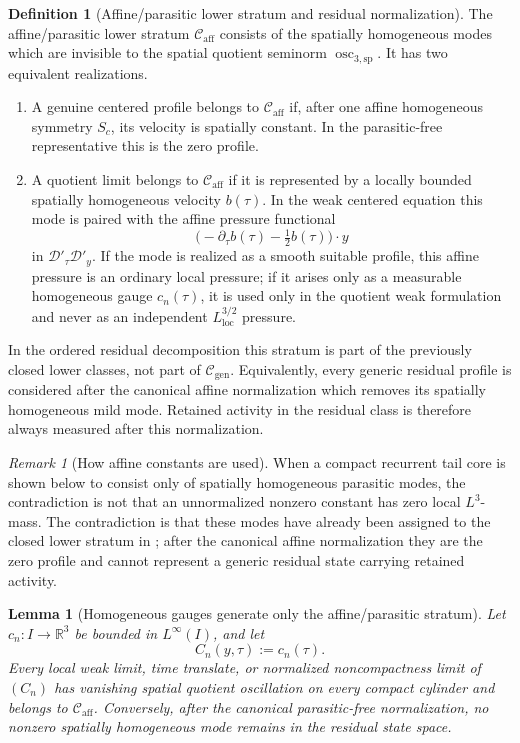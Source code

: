 \documentclass[11pt]{amsart}
\numberwithin{equation}{section}
\theoremstyle{plain}
\newtheorem{lemma}[theorem]{Lemma}
\theoremstyle{definition}
\newtheorem{definition}[theorem]{Definition}
\theoremstyle{remark}
\newtheorem{remark}[theorem]{Remark}
\newcommand{\loc}{\mathrm{loc}}
\newcommand{\Caff}{\mathcal C_{\mathrm{aff}}}
\newcommand{\Cgen}{\mathcal C_{\mathrm{gen}}}
\newcommand{\oscsp}{\operatorname{osc}_{3,\mathrm{sp}}}
\begin{document}
\begin{definition}[Affine/parasitic lower stratum and residual normalization]
\label{def:affine-constant-lower-stratum}
The affine/parasitic lower stratum \(\Caff\) consists of the spatially
homogeneous modes which are invisible to the spatial quotient seminorm
\(\oscsp\).  It has
two equivalent realizations.
\begin{enumerate}[label=\textup{(\roman*)}]
   \item A genuine centered profile belongs to \(\Caff\) if, after one affine
   homogeneous symmetry \(S_c\), its velocity is spatially constant.  In the
   parasitic-free representative this is the zero profile.
   \item A quotient limit belongs to \(\Caff\) if it is represented by a
   locally bounded spatially homogeneous velocity \(b(\tau)\).  In the weak
   centered equation this mode is paired with the affine pressure functional
   \[
      \bigl(-\partial_\tau b(\tau)-\tfrac12 b(\tau)\bigr)\cdot y
   \]
   in \(\mathcal D'_\tau\mathcal D'_y\).  If the mode is realized as a smooth
   suitable profile, this affine pressure is an ordinary local pressure; if it
   arises only as a measurable homogeneous gauge \(c_n(\tau)\), it is used only
   in the quotient weak formulation and never as an independent
   \(L^{3/2}_{\loc}\) pressure.
\end{enumerate}
In the ordered residual decomposition this stratum is part of the previously
closed lower classes, not part of \(\Cgen\).  Equivalently, every generic
residual profile is considered after the canonical affine normalization which
removes its spatially homogeneous mild mode.  Retained activity in the residual
class is therefore always measured after this normalization.
\end{definition}

\begin{remark}[How affine constants are used]
\label{rem:affine-constant-use}
When a compact recurrent tail core is shown below to consist only of spatially
homogeneous parasitic modes, the contradiction is not that an unnormalized
nonzero constant has zero local \(L^3\)-mass.  The contradiction is that these
modes have already been assigned to the closed lower stratum in
; after the canonical affine
normalization they are the zero profile and cannot represent a generic residual
state carrying retained activity.
\end{remark}

\begin{lemma}[Homogeneous gauges generate only the affine/parasitic stratum]
\label{lem:homogeneous-gauges-are-affine-stratum}
Let \(c_n:I\to\mathbb R^3\) be bounded in \(L^\infty(I)\), and let
\[
   C_n(y,\tau):=c_n(\tau).
\]
Every local weak limit, time translate, or normalized noncompactness limit of
\((C_n)\) has vanishing spatial quotient oscillation on every compact cylinder
and belongs to \(\Caff\).  Conversely, after the canonical
parasitic-free normalization, no nonzero spatially homogeneous mode remains in
the residual state space.
\end{lemma}
\end{document}
